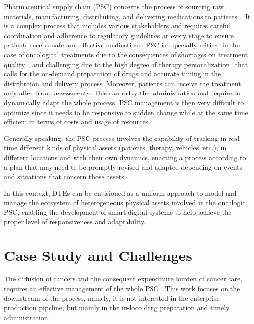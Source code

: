
Pharmaceutical supply chain (PSC) concerns the process of sourcing raw materials, manufacturing, distributing, and delivering medications to patients~\cite{SHAH2004929}. It is a complex process that includes various stakeholders and requires careful coordination and adherence to regulatory guidelines at every stage to ensure patients receive safe and effective medications.
%
PSC is especially critical in the case of oncological treatments due to the consequences of shortages on treatment quality~\cite{Nonzee2018,McBride2022}, and challenging due to the high degree of therapy personalization~\cite{ZUGAZAGOITIA20161551} that calls for
the on-demand preparation of drugs and accurate timing in the
distribution and delivery process. 
%
Moreover, patients can receive the treatment only after blood assessments. This can delay the administration and require to dynamically adapt the whole process.
%
PSC management is then very difficult to optimize since it needs to be responsive to sudden change while at the same time efficient in terms of costs and usage of resources.

Generally speaking, the PSC process involves the capability of tracking in real-time different kinds of physical assets (patients, therapy, vehicles, etc.), in different locations and with their own dynamics, enacting a process according to a plan that may need to be promptly revised and adapted depending on events and situations that concern those assets.

In this context, \acp{DTE} can be envisioned as a uniform approach to model and manage the ecosystem of heterogeneous physical assets involved in the oncologic PSC, enabling the development of smart digital systems to help achieve the proper level of responsiveness and adaptability. 


\section{Case Study and Challenges}
The diffusion of cancers and the consequent expenditure burden of cancer care, requires an effective management of the whole PSC \cite{Chen2023}.
%
This work focuses on the downstream of the process, namely, it is not interested in the enterprise production pipeline, but mainly in the in-loco drug preparation and timely administration~\cite{Papalexi2020}. 

